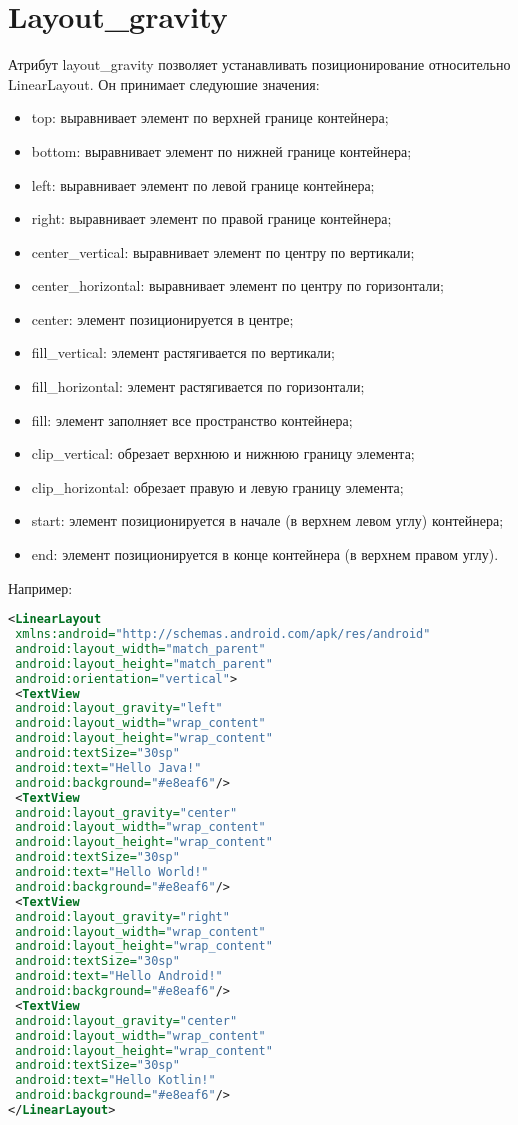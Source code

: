 \section{Layout\_gravity}
Атрибут layout\_gravity позволяет устанавливать позиционирование
относительно LinearLayout.
Он принимает следуюшие значения:
\begin{itemize}
    \item top: выравнивает элемент по верхней границе контейнера;
    \item bottom: выравнивает элемент по нижней границе контейнера;
    \item left: выравнивает элемент по левой границе контейнера;
    \item right: выравнивает элемент по правой границе контейнера;
    \item center\_vertical: выравнивает элемент по центру по вертикали;
    \item center\_horizontal: выравнивает элемент по центру по горизонтали;
    \item center: элемент позиционируется в центре;
    \item fill\_vertical: элемент растягивается по вертикали;
    \item fill\_horizontal: элемент растягивается по горизонтали;
    \item fill: элемент заполняет все пространство контейнера;
    \item clip\_vertical: обрезает верхнюю и нижнюю границу элемента;
    \item clip\_horizontal: обрезает правую и левую границу элемента;
    \item start: элемент позиционируется в начале (в верхнем левом углу) контейнера;
    \item end: элемент позиционируется в конце контейнера (в верхнем правом
    углу).
\end{itemize}
Например:
\begin{lstlisting}[language=xml, caption=\leftline{xml}, label=lst:Layoutgravity2]
<LinearLayout
 xmlns:android="http://schemas.android.com/apk/res/android"
 android:layout_width="match_parent"
 android:layout_height="match_parent"
 android:orientation="vertical">
 <TextView
 android:layout_gravity="left"
 android:layout_width="wrap_content"
 android:layout_height="wrap_content"
 android:textSize="30sp"
 android:text="Hello Java!"
 android:background="#e8eaf6"/>
 <TextView
 android:layout_gravity="center"
 android:layout_width="wrap_content"
 android:layout_height="wrap_content"
 android:textSize="30sp"
 android:text="Hello World!"
 android:background="#e8eaf6"/>
 <TextView
 android:layout_gravity="right"
 android:layout_width="wrap_content"
 android:layout_height="wrap_content"
 android:textSize="30sp"
 android:text="Hello Android!"
 android:background="#e8eaf6"/>
 <TextView
 android:layout_gravity="center"
 android:layout_width="wrap_content"
 android:layout_height="wrap_content"
 android:textSize="30sp"
 android:text="Hello Kotlin!"
 android:background="#e8eaf6"/>
</LinearLayout>
\end{lstlisting}

